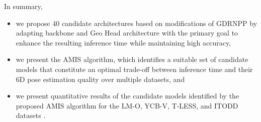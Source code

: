 In summary,
\begin{itemize}
    \item we propose 40 candidate architectures based on modifications of GDRNPP \cite{liuShanicelGdrnpp_bop20222024} by adapting backbone and Geo Head architecture with the primary goal to enhance the resulting inference time while maintaining high accuracy,
    \item we present the AMIS algorithm, which identifies a suitable set of candidate models that constitute an optimal trade-off between inference time and their 6D pose estimation quality over multiple datasets, and
    \item we present quantitative results of the candidate models identified by the proposed AMIS algorithm for the LM-O, YCB-V, T-LESS, and ITODD datasets \cite{xiang2017posecnn, drost2017introducing, hodan2017t,}.
\end{itemize}